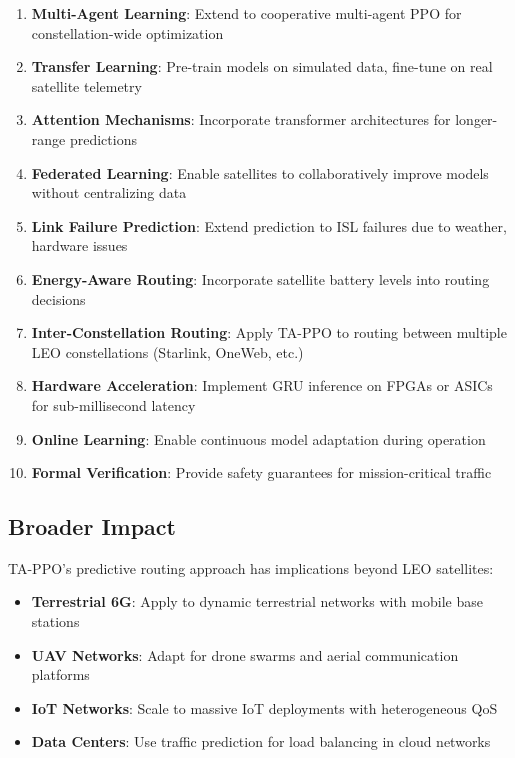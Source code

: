 \begin{enumerate}
\item \textbf{Multi-Agent Learning}: Extend to cooperative multi-agent PPO for constellation-wide optimization

\item \textbf{Transfer Learning}: Pre-train models on simulated data, fine-tune on real satellite telemetry

\item \textbf{Attention Mechanisms}: Incorporate transformer architectures for longer-range predictions

\item \textbf{Federated Learning}: Enable satellites to collaboratively improve models without centralizing data

\item \textbf{Link Failure Prediction}: Extend prediction to ISL failures due to weather, hardware issues

\item \textbf{Energy-Aware Routing}: Incorporate satellite battery levels into routing decisions

\item \textbf{Inter-Constellation Routing}: Apply TA-PPO to routing between multiple LEO constellations (Starlink, OneWeb, etc.)

\item \textbf{Hardware Acceleration}: Implement GRU inference on FPGAs or ASICs for sub-millisecond latency

\item \textbf{Online Learning}: Enable continuous model adaptation during operation

\item \textbf{Formal Verification}: Provide safety guarantees for mission-critical traffic
\end{enumerate}

\subsection{Broader Impact}

TA-PPO's predictive routing approach has implications beyond LEO satellites:

\begin{itemize}
\item \textbf{Terrestrial 6G}: Apply to dynamic terrestrial networks with mobile base stations
\item \textbf{UAV Networks}: Adapt for drone swarms and aerial communication platforms
\item \textbf{IoT Networks}: Scale to massive IoT deployments with heterogeneous QoS
\item \textbf{Data Centers}: Use traffic prediction for load balancing in cloud networks
\end{itemize}

